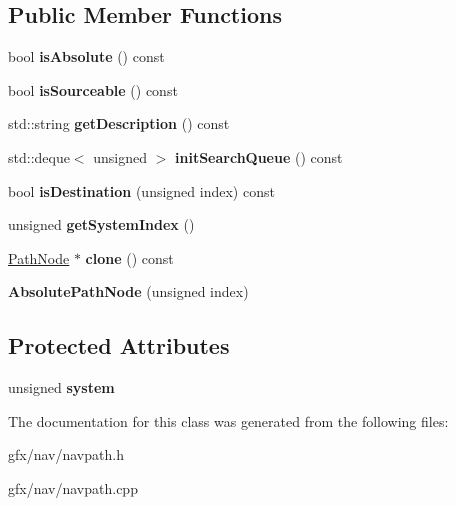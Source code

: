 \subsection*{Public Member Functions}
\begin{DoxyCompactItemize}
\item 
bool {\bfseries is\+Absolute} () const \hypertarget{classAbsolutePathNode_a4fb9da7a2171abe342d46cc8f1c970ff}{}\label{classAbsolutePathNode_a4fb9da7a2171abe342d46cc8f1c970ff}

\item 
bool {\bfseries is\+Sourceable} () const \hypertarget{classAbsolutePathNode_a25c7b9536b3626ec0548ac0a58b171d9}{}\label{classAbsolutePathNode_a25c7b9536b3626ec0548ac0a58b171d9}

\item 
std\+::string {\bfseries get\+Description} () const \hypertarget{classAbsolutePathNode_a0ac09ab7e5c539d541f55bdc3878ac63}{}\label{classAbsolutePathNode_a0ac09ab7e5c539d541f55bdc3878ac63}

\item 
std\+::deque$<$ unsigned $>$ {\bfseries init\+Search\+Queue} () const \hypertarget{classAbsolutePathNode_a593caba54fcfeb665b5b1397498f79b8}{}\label{classAbsolutePathNode_a593caba54fcfeb665b5b1397498f79b8}

\item 
bool {\bfseries is\+Destination} (unsigned index) const \hypertarget{classAbsolutePathNode_a7b34e8ba71e983bf0379ded385f73a78}{}\label{classAbsolutePathNode_a7b34e8ba71e983bf0379ded385f73a78}

\item 
unsigned {\bfseries get\+System\+Index} ()\hypertarget{classAbsolutePathNode_ae0b165e1f774d5c7441df8c24f83f346}{}\label{classAbsolutePathNode_ae0b165e1f774d5c7441df8c24f83f346}

\item 
\hyperlink{classPathNode}{Path\+Node} $\ast$ {\bfseries clone} () const \hypertarget{classAbsolutePathNode_a3879494f8279fdec61fe3fb64fae0faf}{}\label{classAbsolutePathNode_a3879494f8279fdec61fe3fb64fae0faf}

\item 
{\bfseries Absolute\+Path\+Node} (unsigned index)\hypertarget{classAbsolutePathNode_a1e53a0cab765a6aa8ac514c92ce6a230}{}\label{classAbsolutePathNode_a1e53a0cab765a6aa8ac514c92ce6a230}

\end{DoxyCompactItemize}
\subsection*{Protected Attributes}
\begin{DoxyCompactItemize}
\item 
unsigned {\bfseries system}\hypertarget{classAbsolutePathNode_a2bc9b1aa2276936dae066178d3350c2c}{}\label{classAbsolutePathNode_a2bc9b1aa2276936dae066178d3350c2c}

\end{DoxyCompactItemize}


The documentation for this class was generated from the following files\+:\begin{DoxyCompactItemize}
\item 
gfx/nav/navpath.\+h\item 
gfx/nav/navpath.\+cpp\end{DoxyCompactItemize}
